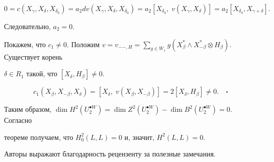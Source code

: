 $$ 


0=c(X_\gamma,X_\delta,X_{\delta_0})=a_2 


dv(X_\gamma,X_\delta,X_{\delta_0})= 


a_2[X_{\delta_0},\;v(X_\gamma,X_\delta)]= 


a_2[X_{\delta_0},X_{\gamma+\delta}]. 


$$ 


Следовательно, $a_2=0$. 


 


Покажем, что $c_1\ne0$. Положим $v=v_{--,H}=\sum\limits_{g\in 


W_1}g(X^*_\beta\wedge X^*_{-\beta}\otimes H_\beta)$. Существует корень 


$\delta\in R_1$ такой, что $[X_\delta,H_\beta]\ne0$. 


$$ 


c_1(X_\beta,X_{-\beta},X_\delta)= 


[X_\delta,\;v(X_\beta,X_{-\beta})]= 


2[X_\delta,H_\beta]\ne0.\quad\square 


$$ 


 


Таким образом, $\dim H^2(U^{\bullet W}_2)= 


\dim Z^2(U^{\bullet W}_2)-\dim B^2(U^{\bullet W}_2)=0$. Согласно 


теореме получаем, что $H^2_0(L,L)=0$ и, значит, $H^2(L,L)=0$. 


 


 


Авторы выражают благодарность рецензенту за полезные замечания. 


 


